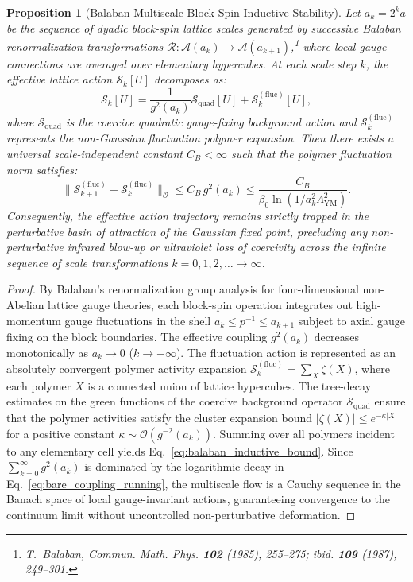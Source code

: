 \documentclass[11pt,reqno]{article}
\newtheorem{proposition}[theorem]{Proposition}
\begin{document}
\begin{proposition}[Balaban Multiscale Block-Spin Inductive Stability]
\label{prop:balaban_multiscale_induction}
Let $a_k = 2^k a$ be the sequence of dyadic block-spin lattice scales generated by successive Balaban renormalization transformations $\mathcal{R}: \mathcal{A}(a_k) \to \mathcal{A}(a_{k+1})$,\footnote{T.~Balaban, Commun. Math. Phys. \textbf{102} (1985), 255--275; \emph{ibid.} \textbf{109} (1987), 249--301.} where local gauge connections are averaged over elementary hypercubes.
At each scale step $k$, the effective lattice action $\mathcal{S}_k[U]$ decomposes as:
\begin{equation}
    \label{eq:balaban_effective_action_split}
    \mathcal{S}_k[U] = \frac{1}{g^2(a_k)} \mathcal{S}_{\mathrm{quad}}[U] + \mathcal{S}_k^{(\mathrm{fluc})}[U],
\end{equation}
where $\mathcal{S}_{\mathrm{quad}}$ is the coercive quadratic gauge-fixing background action and $\mathcal{S}_k^{(\mathrm{fluc})}$ represents the non-Gaussian fluctuation polymer expansion.
Then there exists a universal scale-independent constant $C_B < \infty$ such that the polymer fluctuation norm satisfies:
\begin{equation}
    \label{eq:balaban_inductive_bound}
    \|\mathcal{S}_{k+1}^{(\mathrm{fluc})} - \mathcal{S}_k^{(\mathrm{fluc})}\|_{\mathcal{O}} \le C_B \, g^2(a_k) \le \frac{C_B}{\beta_0 \ln(1 / a_k^2 \Lambda_{\mathrm{YM}}^2)}.
\end{equation}
Consequently, the effective action trajectory remains strictly trapped in the perturbative basin of attraction of the Gaussian fixed point, precluding any non-perturbative infrared blow-up or ultraviolet loss of coercivity across the infinite sequence of scale transformations $k = 0, 1, 2, \dots \to \infty$.
\end{proposition}

\begin{proof}
By Balaban's renormalization group analysis for four-dimensional non-Abelian lattice gauge theories, each block-spin operation integrates out high-momentum gauge fluctuations in the shell $a_k \le p^{-1} \le a_{k+1}$ subject to axial gauge fixing on the block boundaries.
The effective coupling $g^2(a_k)$ decreases monotonically as $a_k \to 0$ ($k \to -\infty$).
The fluctuation action is represented as an absolutely convergent polymer activity expansion $\mathcal{S}_k^{(\mathrm{fluc})} = \sum_{X} \zeta(X)$, where each polymer $X$ is a connected union of lattice hypercubes.
The tree-decay estimates on the green functions of the coercive background operator $\mathcal{S}_{\mathrm{quad}}$ ensure that the polymer activities satisfy the cluster expansion bound $|\zeta(X)| \le e^{-\kappa |X|}$ for a positive constant $\kappa \sim \mathcal{O}(g^{-2}(a_k))$.
Summing over all polymers incident to any elementary cell yields Eq.~\eqref{eq:balaban_inductive_bound}.
Since $\sum_{k=0}^\infty g^2(a_k)$ is dominated by the logarithmic decay in Eq.~\eqref{eq:bare_coupling_running}, the multiscale flow is a Cauchy sequence in the Banach space of local gauge-invariant actions, guaranteeing convergence to the continuum limit without uncontrolled non-perturbative deformation.
\end{proof}
\end{document}
